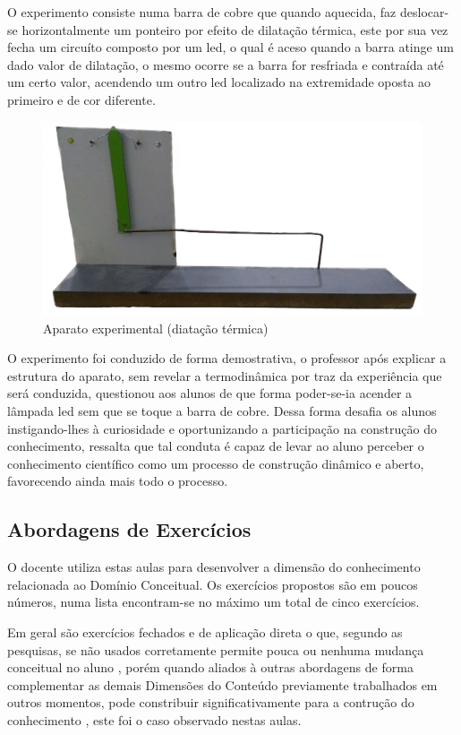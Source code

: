 O experimento consiste numa barra de cobre que quando aquecida, faz deslocar-se horizontalmente um ponteiro por efeito de dilatação térmica, este por sua vez fecha um circuíto composto por um led, o qual é aceso quando a barra atinge um dado valor de dilatação, o mesmo ocorre se a barra for resfriada e contraída até um certo valor, acendendo um outro led localizado na extremidade oposta ao primeiro e de cor diferente.

\setlength\intextsep{0pt}
\begin{figure}
	\centering
	\caption{Aparato experimental (diatação térmica)}
	\label{fig:exp-aparato}
	\includegraphics[width=.45\textwidth]{assets/aparato_exp.png}
\end{figure}

O experimento foi conduzido de forma demostrativa, o professor após explicar a estrutura do aparato, sem revelar a termodinâmica por traz da experiência que será conduzida, questionou aos alunos de que forma poder-se-ia acender a lâmpada led sem que se toque a barra de cobre. Dessa forma desafia os alunos instigando-lhes à curiosidade e oportunizando a participação na construção do conhecimento,  ressalta que tal conduta é capaz de levar ao aluno perceber o conhecimento científico como um processo de construção dinâmico e aberto, favorecendo ainda mais todo o processo.

\subsection{Abordagens de Exercícios} %
\label{sub:Abordagens de Exercícios}
O docente utiliza estas aulas para desenvolver a dimensão do conhecimento relacionada ao Domínio Conceitual. Os exercícios propostos são em poucos números, numa lista encontram-se no máximo um total de cinco exercícios.

Em geral são exercícios fechados e de aplicação direta o que, segundo as pesquisas, se não usados corretamente permite pouca ou nenhuma mudança conceitual no aluno \cite{CLEMENT:2012}, porém quando aliados à outras abordagens de forma complementar as demais Dimensões do Conteúdo previamente trabalhados em outros momentos, pode constribuir significativamente para a contrução do conhecimento \cite{PEREZ:1992}, este foi o caso observado nestas aulas.



